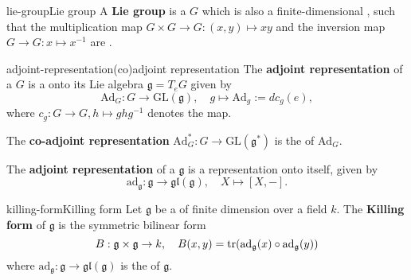 \begin{topic}{lie-group}{Lie group}
    A \textbf{Lie group} is a  $G$ which is also a finite-dimensional , such that the multiplication map $G \times G \to G : (x, y) \mapsto xy$ and the inversion map $G \to G : x \mapsto x^{-1}$ are .
\end{topic}

\begin{topic}{adjoint-representation}{(co)adjoint representation}
    The \textbf{adjoint representation} of a  $G$ is a  onto its Lie algebra $\mathfrak{g} = T_e G$ given by
    \[ \text{Ad}_G : G \to \text{GL}(\mathfrak{g}), \quad g \mapsto \text{Ad}_g := d c_g(e) , \]
    where $c_g : G \to G, h \mapsto g h g^{-1}$ denotes the  map.
    
    The \textbf{co-adjoint representation} $\text{Ad}_G^* : G \to \text{GL}(\mathfrak{g}^*)$ is the  of $\text{Ad}_G$.
    
    The \textbf{adjoint representation} of a  $\mathfrak{g}$ is a representation onto itself, given by
    \[ \text{ad}_{\mathfrak{g}}: \mathfrak{g} \to \mathfrak{gl}(\mathfrak{g}), \quad X \mapsto [X, -] . \]
\end{topic}

\begin{topic}{killing-form}{Killing form}
    Let $\mathfrak{g}$ be a  of finite dimension over a field $k$. The \textbf{Killing form} of $\mathfrak{g}$ is the symmetric bilinear form
    \[ B : \mathfrak{g} \times \mathfrak{g} \to k, \quad B(x, y) = \textup{tr}(\textup{ad}_{\mathfrak{g}}(x) \circ \textup{ad}_{\mathfrak{g}}(y)) \]
    where $\text{ad}_\mathfrak{g} : \mathfrak{g} \to \mathfrak{gl}(\mathfrak{g})$ is the  of $\mathfrak{g}$.
\end{topic}
